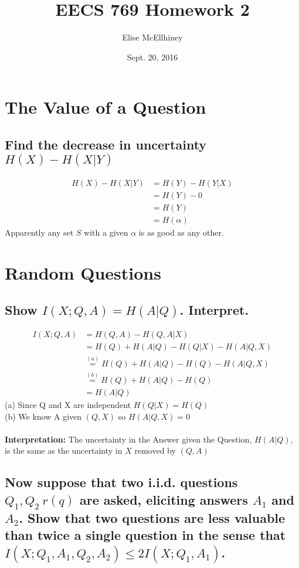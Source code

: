 \documentclass[11pt, oneside]{book}   	%
\title{EECS 769 Homework 2}
\author{Elise McEllhiney}
\date{Sept. 20, 2016}							%
\begin{document}
\maketitle

\section{The Value of a Question}
\subsection{Find the decrease in uncertainty $H(X)-H(X|Y)$}

\begin{equation}
\begin{split}
 H(X)-H(X|Y) & = H(Y)-H(Y|X)\\
 & = H(Y)-0\\
 & =H(Y)\\
 &= H(\alpha)
\end{split}
\end{equation}
Apparently any set $S$ with a given $\alpha$ is as good as any other.

\section{Random Questions}
\subsection{Show $I(X;Q,A)=H(A|Q)$. Interpret.}

\begin{equation}
\begin{split}
 I(X;Q,A) & = H(Q,A) - H(Q,A | X)\\
 & = H(Q) + H(A|Q) - H(Q|X) - H(A|Q,X)\\
 & \overset{(a)}{=} H(Q) + H(A|Q) - H(Q) - H(A|Q,X) \\
 & \overset{(b)}{=} H(Q) + H(A|Q) - H(Q) \\
 & = H(A|Q)
\end{split}
\end{equation}
(a) Since Q and X are independent $H(Q|X)=H(Q)$\\
(b) We know A given $(Q,X)$ so $H(A|Q,X)=0$\\\\
\textbf{Interpretation:} The uncertainty in the Answer given the Question, $H(A|Q)$, is the same as the uncertainty in $X$ removed by $(Q,A)$

\subsection{Now suppose that two i.i.d. questions $Q_1, Q_2 ~ r(q)$ are asked, eliciting answers $A_1$ and $A_2$.  Show that two questions are less valuable than twice a single question in the sense that $I(X;Q_1,A_1,Q_2,A_2) \leq 2I(X;Q_1,A_1)$.}
\end{document}
